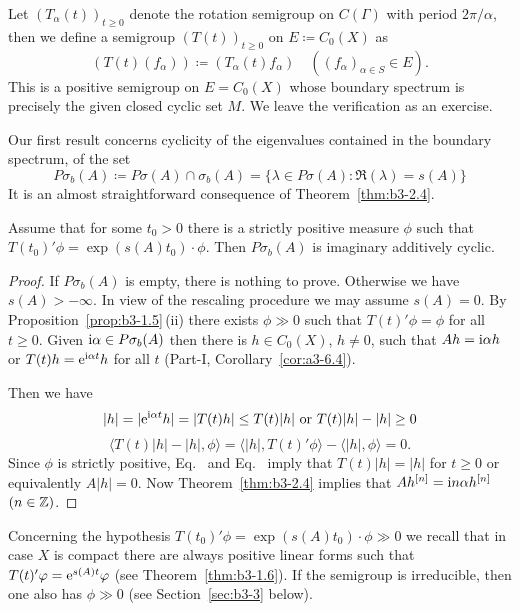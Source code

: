 \begin{examples}
\begin{enumerate}[\upshape (i), wide, labelindent=.25em]
Let $(T_{\alpha}(t))_{t \geq 0}$ denote the rotation semigroup on $C(\Gamma)$ with period $2\pi/\alpha$, then we define a semigroup $(T(t))_{t \geq 0}$ on $E \coloneq C_{0}(X)$ as
	\[
	(T(t)(f_{\alpha})) \coloneq (T_{\alpha}(t)f_{\alpha}) \quad ((f_{\alpha})_{\alpha \in S} \in E).
	\]
	This is a positive semigroup on $E = C_{0}(X)$ whose boundary spectrum is precisely the given closed cyclic set $M$.
	We leave the verification as an exercise.
	
\end{enumerate}
\end{examples}
Our first result concerns cyclicity of the eigenvalues contained in the boundary spectrum, \ie of the set
	\[
	P\sigma_{b}(A) \coloneq P\sigma(A) \cap \sigma_{b}(A) = \{\lambda \in P\sigma(A) \colon \Re(\lambda)  = s(A)\}
	\]
	It is an almost straightforward consequence of Theorem~\ref{thm:b3-2.4}.
	\begin{proposition}\label{prop:b3-2.7}
		
		Assume that for some $t_{0} > 0$ there is a strictly positive measure $\phi$ such that $T(t_{0})'\phi = \exp(s(A)t_{0})\cdot\phi$.
		Then $P\sigma_{b}(A)$ is imaginary additively cyclic.
	\end{proposition}
\begin{proof}
If\/ $P\sigma_{b}(A)$ is empty, there is nothing to prove.
Otherwise we have $s(A) > -\infty$.
In view of the rescaling procedure we may assume $s(A) = 0$.
By Proposition~\ref{prop:b3-1.5}\,(ii) there exists $\phi \gg 0$ such that $T(t)'\phi = \phi$ for all $t \geq 0$.
Given $\mathrm{i} \alpha \in P\sigma_{b}(A)$ then there is $h \in C_{0}(X)$, $h \neq 0$, such that $Ah = \mathrm{i}\alpha h$ or $T(t)h = \mathrm{e}^{\mathrm{i}\alpha t}h$ for all $t$ (Part-I, Corollary~\ref{cor:a3-6.4}).

	Then we have
	\begin{equation}\label{eq:b3-2.14}
		|h| = |\eu^{\im\alpha t}h| = |T(t)h| \leq T(t)|h| \text{ or } T(t)|h| - |h| \geq 0
	\end{equation}
	\begin{equation}\label{eq:b3-2.15}
		\langle T(t)|h| - |h|,\phi \rangle = \langle |h|,T(t)'\phi \rangle - \langle |h|,\phi \rangle = 0.
	\end{equation}
	Since $\phi$ is strictly positive, Eq.~  and Eq.~ imply that $T(t)|h| = |h|$ for $t \geq 0$ or equivalently $A|h| = 0$.
	Now Theorem~\ref{thm:b3-2.4} implies that $Ah^{[n]} = \mathrm{i} n\alpha h^{[n]}$ $(n \in \mathbb{Z})$.
\end{proof}
Concerning the hypothesis $T(t_{0})'\phi = \exp(s(A)t_{0})\cdot\phi \gg 0$ we recall that in case $X$ is compact there are always positive linear forms such that $T(t)'\phi = \eu^{s(A)t}\phi$ (see Theorem~\ref{thm:b3-1.6}).
If the semigroup is irreducible, then one also has $\phi \gg 0$ (see Section~\ref{sec:b3-3} below).

